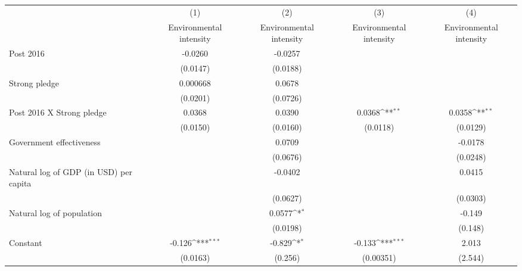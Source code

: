{
\def\sym#1{\ifmmode^{#1}\else\(^{#1}\)\fi}
\begin{tabular}{l*{4}{c}}
\hline\hline
                    &\multicolumn{1}{c}{(1)}&\multicolumn{1}{c}{(2)}&\multicolumn{1}{c}{(3)}&\multicolumn{1}{c}{(4)}\\
                    &\multicolumn{1}{c}{Environmental intensity}&\multicolumn{1}{c}{Environmental intensity}&\multicolumn{1}{c}{Environmental intensity}&\multicolumn{1}{c}{Environmental intensity}\\
\hline
Post 2016           &     -0.0260         &     -0.0257         &                     &                     \\
                    &    (0.0147)         &    (0.0188)         &                     &                     \\
[1em]
Strong pledge       &    0.000668         &      0.0678         &                     &                     \\
                    &    (0.0201)         &    (0.0726)         &                     &                     \\
[1em]
Post 2016 X Strong pledge&      0.0368         &      0.0390         &      0.0368\sym{**} &      0.0358\sym{**} \\
                    &    (0.0150)         &    (0.0160)         &    (0.0118)         &    (0.0129)         \\
[1em]
Government effectiveness&                     &      0.0709         &                     &     -0.0178         \\
                    &                     &    (0.0676)         &                     &    (0.0248)         \\
[1em]
Natural log of GDP (in USD) per capita&                     &     -0.0402         &                     &      0.0415         \\
                    &                     &    (0.0627)         &                     &    (0.0303)         \\
[1em]
Natural log of population&                     &      0.0577\sym{*}  &                     &      -0.149         \\
                    &                     &    (0.0198)         &                     &     (0.148)         \\
[1em]
Constant            &      -0.126\sym{***}&      -0.829\sym{*}  &      -0.133\sym{***}&       2.013         \\
                    &    (0.0163)         &     (0.256)         &   (0.00351)         &     (2.544)         \\

\end{tabular}}
